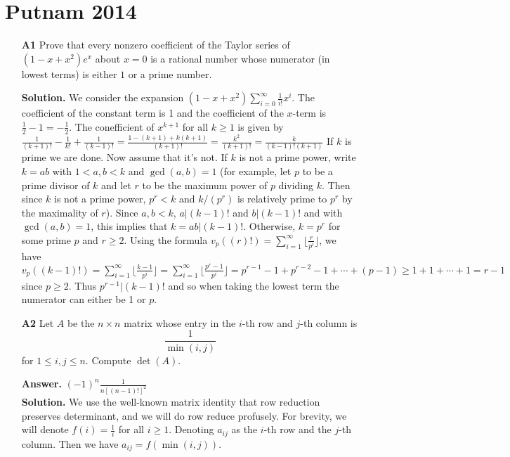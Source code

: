 \documentclass[11pt,a4paper]{article}
\newcommand{\<}{\langle}
\renewcommand{\>}{\rangle}
\begin{document}
\newcommand{\sgn}{\text{sgn}}
\setcounter{secnumdepth}{0}

\section{Putnam 2014}
\begin{enumerate}
	\item [\textbf{A1}]Prove that every nonzero coefficient of the Taylor series of $(1-x+x^2)e^x$ about $x=0$ is a rational number whose numerator (in lowest terms) is either $1$ or a prime number.
	
	\textbf{Solution.} We consider the expansion $(1-x+x^2)\displaystyle\sum_{i=0}^{\infty} \frac{1}{i!}x^i$. The coefficient of the constant term is 1 and the coefficient of the $x$-term is $\frac{1}{2}-1=-\frac{1}{2}$. The conefficient of $x^{k+1}$ for all $k\ge 1$ is given by $\frac{1}{(k+1)!}-\frac{1}{k!}+\frac{1}{(k-1)!}
	=\frac{1-(k+1)+k(k+1)}{(k+1)!}
	=\frac{k^2}{(k+1)!}
	=\frac{k}{(k-1)!(k+1)}
	$
	If $k$ is prime we are done. 
	Now assume that it's not. If $k$ is not a prime power, write $k=ab$ with $1<a, b<k$ and $\gcd(a, b)=1$ (for example, let $p$ to be a prime divisor of $k$ and let $r$ to be the maximum power of $p$ dividing $k$. Then since $k$ is not a prime power, $p^r<k$ and $k/(p^r)$ is relatively prime to $p^r$ by the maximality of $r$). Since $a, b<k$, $a|(k-1)!$ and $b|(k-1)!$ and with $\gcd(a, b)=1$, this implies that $k=ab|(k-1)!$. Otherwise, $k=p^r$ for some prime $p$ and $r\ge 2$. Using the formula $v_p((r)!)=\sum_{i=1}^\infty\lfloor\frac{r}{p^i}\rfloor$, we have 
	$v_p((k-1)!)=\sum_{i=1}^\infty\lfloor\frac{k-1}{p^i}\rfloor
	=\sum_{i=1}^\infty\lfloor\frac{p^r-1}{p^i}\rfloor
	=p^{r-1}-1+p^{r-2}-1+\cdots + (p-1)
	\ge 1+1+\cdots + 1
	= r-1
	$
	since $p\ge 2$. Thus $p^{r-1}|(k-1)!$ and so when taking the lowest term the numerator can either be 1 or $p$. 
	
	\item[\textbf{A2}]Let $A$ be the $n\times n$ matrix whose entry in the $i$-th row and $j$-th column is \[\frac1{\min(i,j)}\] for $1\le i,j\le n.$ Compute $\det(A).$
	
	\textbf{Answer.} $(-1)^{n}\frac{1}{n[(n-1)!]^2}$\\
	\textbf{Solution.} We use the well-known matrix identity that row reduction preserves determinant, and we will do row reduce profusely. For brevity, we will denote $f(i)=\frac{1}{i}$ for all $i\ge 1$. Denoting $a_{ij}$ as the $i$-th row and the $j$-th column. Then we have $a_{ij}=f(\min(i, j))$. 
	

\end{enumerate}
\end{document}
